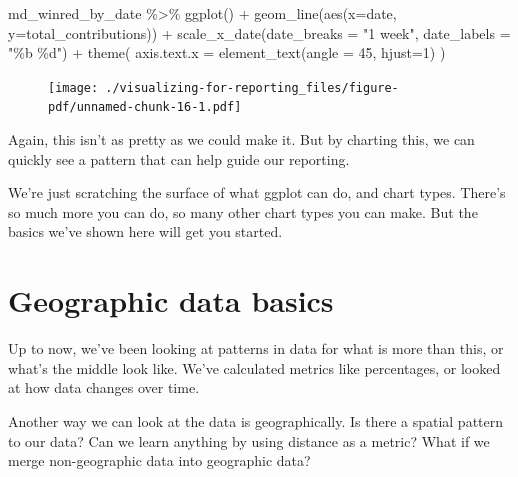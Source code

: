 \documentclass[
  letterpaper,
  DIV=11,
  numbers=noendperiod]{scrreprt}
\newenvironment{Shaded}{\begin{snugshade}}{\end{snugshade}}
\newcommand{\AttributeTok}[1]{\textcolor[rgb]{0.40,0.45,0.13}{#1}}
\newcommand{\DecValTok}[1]{\textcolor[rgb]{0.68,0.00,0.00}{#1}}
\newcommand{\FunctionTok}[1]{\textcolor[rgb]{0.28,0.35,0.67}{#1}}
\newcommand{\NormalTok}[1]{\textcolor[rgb]{0.00,0.23,0.31}{#1}}
\newcommand{\SpecialCharTok}[1]{\textcolor[rgb]{0.37,0.37,0.37}{#1}}
\newcommand{\StringTok}[1]{\textcolor[rgb]{0.13,0.47,0.30}{#1}}
\begin{document}
\begin{Shaded}
\begin{Highlighting}[]
\NormalTok{md\_winred\_by\_date }\SpecialCharTok{\%\textgreater{}\%}
  \FunctionTok{ggplot}\NormalTok{() }\SpecialCharTok{+} 
  \FunctionTok{geom\_line}\NormalTok{(}\FunctionTok{aes}\NormalTok{(}\AttributeTok{x=}\NormalTok{date, }\AttributeTok{y=}\NormalTok{total\_contributions)) }\SpecialCharTok{+} 
  \FunctionTok{scale\_x\_date}\NormalTok{(}\AttributeTok{date\_breaks =} \StringTok{"1 week"}\NormalTok{, }\AttributeTok{date\_labels =} \StringTok{"\%b \%d"}\NormalTok{) }\SpecialCharTok{+}
  \FunctionTok{theme}\NormalTok{(}
    \AttributeTok{axis.text.x =} \FunctionTok{element\_text}\NormalTok{(}\AttributeTok{angle =} \DecValTok{45}\NormalTok{,  }\AttributeTok{hjust=}\DecValTok{1}\NormalTok{)}
\NormalTok{  )}
\end{Highlighting}
\end{Shaded}

\begin{figure}[H]

{\centering \texttt{[image: ./visualizing-for-reporting\_files/figure-pdf/unnamed-chunk-16-1.pdf]}

}

\end{figure}

Again, this isn't as pretty as we could make it. But by charting this,
we can quickly see a pattern that can help guide our reporting.

We're just scratching the surface of what ggplot can do, and chart
types. There's so much more you can do, so many other chart types you
can make. But the basics we've shown here will get you started.


\hypertarget{geographic-data-basics}{%
\chapter{Geographic data basics}\label{geographic-data-basics}}

Up to now, we've been looking at patterns in data for what is more than
this, or what's the middle look like. We've calculated metrics like
percentages, or looked at how data changes over time.

Another way we can look at the data is geographically. Is there a
spatial pattern to our data? Can we learn anything by using distance as
a metric? What if we merge non-geographic data into geographic data?
\end{document}
